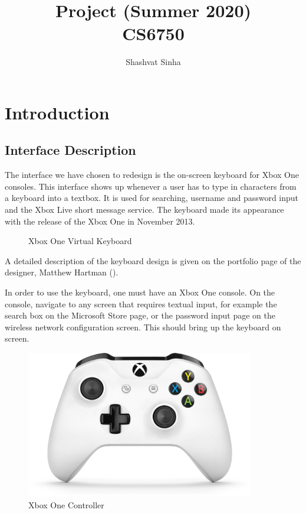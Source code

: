 \documentclass[
	letterpaper, %
]{jdf}
\author{Shashvat Sinha}
\title{Project (Summer 2020)\\CS6750}
\begin{document}

\maketitle

\section{Introduction}
\subsection{Interface Description}
The interface we have chosen to redesign is the on-screen keyboard for Xbox One consoles. This interface shows up whenever a user has to type in characters from a keyboard into a textbox. It is used for searching, username and password input and the Xbox Live short message service. The keyboard made its appearance with the release of the Xbox One in November 2013.

\begin{figure}[h]
	\centering
	\caption{Xbox One Virtual Keyboard}
	\label{fig:xb1keyboard}
\end{figure}


A detailed description of the keyboard design is given on the portfolio page of the designer, Matthew Hartman (\cite{hartman_2013}).


In order to use the keyboard, one must have an Xbox One console. On the console, navigate to any screen that requires textual input, for example the search box on the Microsoft Store page, or the password input page on the wireless network configuration screen. This should bring up the keyboard on screen.

\begin{figure}[h]
	\centering
	\includegraphics[width=10cm]{jdf-master/Figures/xbox-one-controller.png}
	\caption{Xbox One Controller}
	\label{fig:xb1controller}
\end{figure}
\end{document}
